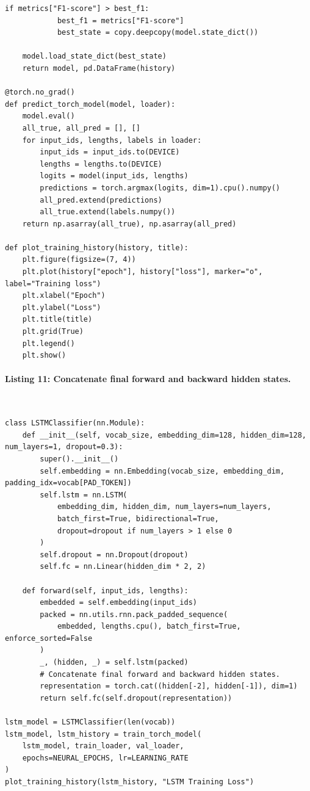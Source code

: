 \documentclass[12pt,a4paper,oneside]{report}
\begin{document}
\begin{Verbatim}[commandchars=\\\{\},breaklines=true,breakanywhere=true,fontsize=\scriptsize,frame=leftline,framesep=2mm,rulecolor=\color{gray}]
        if metrics["F1-score"] > best_f1:
            best_f1 = metrics["F1-score"]
            best_state = copy.deepcopy(model.state_dict())

    model.load_state_dict(best_state)
    return model, pd.DataFrame(history)

@torch.no_grad()
def predict_torch_model(model, loader):
    model.eval()
    all_true, all_pred = [], []
    for input_ids, lengths, labels in loader:
        input_ids = input_ids.to(DEVICE)
        lengths = lengths.to(DEVICE)
        logits = model(input_ids, lengths)
        predictions = torch.argmax(logits, dim=1).cpu().numpy()
        all_pred.extend(predictions)
        all_true.extend(labels.numpy())
    return np.asarray(all_true), np.asarray(all_pred)

def plot_training_history(history, title):
    plt.figure(figsize=(7, 4))
    plt.plot(history["epoch"], history["loss"], marker="o", label="Training loss")
    plt.xlabel("Epoch")
    plt.ylabel("Loss")
    plt.title(title)
    plt.grid(True)
    plt.legend()
    plt.show()
\end{Verbatim}
\paragraph{Listing 11: Concatenate final forward and backward hidden states.}\mbox{}\\[-1ex]
\begin{Verbatim}[commandchars=\\\{\},breaklines=true,breakanywhere=true,fontsize=\scriptsize,frame=leftline,framesep=2mm,rulecolor=\color{gray}]
class LSTMClassifier(nn.Module):
    def __init__(self, vocab_size, embedding_dim=128, hidden_dim=128, num_layers=1, dropout=0.3):
        super().__init__()
        self.embedding = nn.Embedding(vocab_size, embedding_dim, padding_idx=vocab[PAD_TOKEN])
        self.lstm = nn.LSTM(
            embedding_dim, hidden_dim, num_layers=num_layers,
            batch_first=True, bidirectional=True,
            dropout=dropout if num_layers > 1 else 0
        )
        self.dropout = nn.Dropout(dropout)
        self.fc = nn.Linear(hidden_dim * 2, 2)

    def forward(self, input_ids, lengths):
        embedded = self.embedding(input_ids)
        packed = nn.utils.rnn.pack_padded_sequence(
            embedded, lengths.cpu(), batch_first=True, enforce_sorted=False
        )
        _, (hidden, _) = self.lstm(packed)
        # Concatenate final forward and backward hidden states.
        representation = torch.cat((hidden[-2], hidden[-1]), dim=1)
        return self.fc(self.dropout(representation))

lstm_model = LSTMClassifier(len(vocab))
lstm_model, lstm_history = train_torch_model(
    lstm_model, train_loader, val_loader,
    epochs=NEURAL_EPOCHS, lr=LEARNING_RATE
)
plot_training_history(lstm_history, "LSTM Training Loss")
\end{Verbatim}
\end{document}
